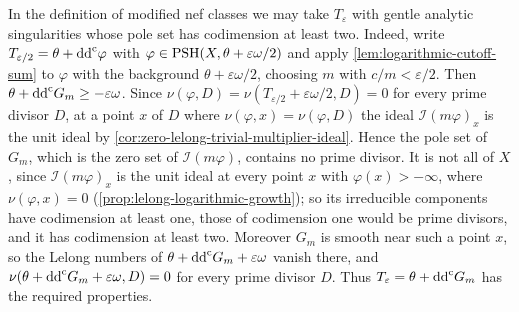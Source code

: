 In the definition of modified nef classes we may take $T_\varepsilon$ with gentle analytic singularities whose pole set has codimension at least two. Indeed, write $T_{\varepsilon/2}=\theta+\mathrm{dd}^{\mathrm{c}}\varphi$ with $\varphi\in\mathrm{PSH}(X,\theta+\varepsilon\omega/2)$ and apply \cref{lem:logarithmic-cutoff-sum} to $\varphi$ with the background $\theta+\varepsilon\omega/2$, choosing $m$ with $c/m<\varepsilon/2$. Then $\theta+\mathrm{dd}^{\mathrm{c}} G_m\geq-\varepsilon\omega$. Since $\nu(\varphi,D)=\nu(T_{\varepsilon/2}+\varepsilon\omega/2,D)=0$ for every prime divisor $D$, at a point $x$ of $D$ where $\nu(\varphi,x)=\nu(\varphi,D)$ the ideal $\mathcal I(m\varphi)_x$ is the unit ideal by \cref{cor:zero-lelong-trivial-multiplier-ideal}. Hence the pole set of $G_m$, which is the zero set of $\mathcal I(m\varphi)$, contains no prime divisor. It is not all of $X$, since $\mathcal I(m\varphi)_x$ is the unit ideal at every point $x$ with $\varphi(x)>-\infty$, where $\nu(\varphi,x)=0$ (\cref{prop:lelong-logarithmic-growth}); so its irreducible components have codimension at least one, those of codimension one would be prime divisors, and it has codimension at least two. Moreover $G_m$ is smooth near such a point $x$, so the Lelong numbers of $\theta+\mathrm{dd}^{\mathrm{c}} G_m+\varepsilon\omega$ vanish there, and $\nu(\theta+\mathrm{dd}^{\mathrm{c}} G_m+\varepsilon\omega,D)=0$ for every prime divisor $D$. Thus $T_\varepsilon=\theta+\mathrm{dd}^{\mathrm{c}} G_m$ has the required properties.

